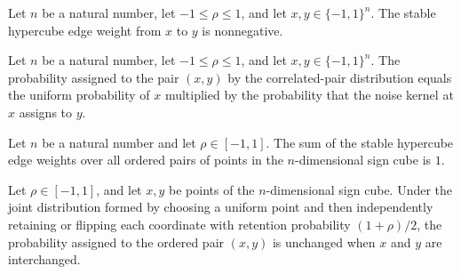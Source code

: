 \begin{theorem}
\label{FABL.stableHypercubeEdgeWeight_nonneg}
\leanok
{}
Let $n$ be a natural number, let $-1\leq \rho\leq 1$, and let $x,y\in\{−1,1\}^n$. The
stable hypercube edge weight from $x$ to $y$ is nonnegative.
\end{theorem}

\begin{theorem}
\label{FABL.stableHypercubeEdgeWeight_eq_uniform_mul_transition}
\leanok
{}
Let $n$ be a natural number, let $-1\leq \rho\leq 1$, and let $x,y\in\{−1,1\}^n$. The
probability assigned to the pair $(x,y)$ by the correlated-pair distribution equals the
uniform probability of $x$ multiplied by the probability that the noise kernel at $x$
assigns to $y$.
\end{theorem}

\begin{theorem}
\label{FABL.sum_stableHypercubeEdgeWeight}
\leanok
{}
Let $n$ be a natural number and let $\rho\in[-1,1]$. The sum of the stable hypercube
edge weights over all ordered pairs of points in the $n$-dimensional sign cube is $1$.
\end{theorem}

\begin{theorem}
\label{FABL.stableHypercubeEdgeWeight_comm}
\leanok
{}
Let $\rho\in[-1,1]$, and let $x,y$ be points of the $n$-dimensional sign cube. Under the
joint distribution formed by choosing a uniform point and then independently retaining
or flipping each coordinate with retention probability $(1+\rho)/2$, the probability
assigned to the ordered pair $(x,y)$ is unchanged when $x$ and $y$ are interchanged.
\end{theorem}

